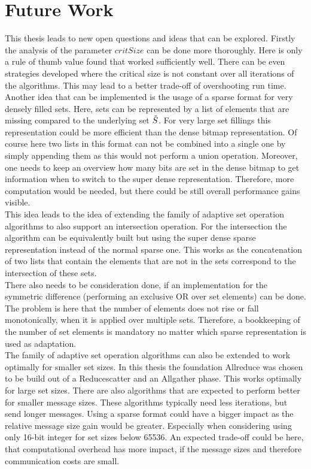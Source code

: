 \section{Future Work}
This thesis leads to new open questions and ideas that can be explored. Firstly the analysis of the parameter $critSize$ can be done more thoroughly. Here is only a rule of thumb value found that worked sufficiently well. There can be even strategies developed where the critical size is not constant over all iterations of the algorithms. This may lead to a better trade-off of overshooting run time.\\
Another idea that can be implemented is the usage of a sparse format for very densely filled sets. Here, sets can be represented by a list of elements that are missing compared to the underlying set $\Tilde{S}$. For very large set fillings this representation could be more efficient than the dense bitmap representation. Of course here two lists in this format can not be combined into a single one by simply appending them as this would not perform a union operation. Moreover, one needs to keep an overview how many bits are set in the dense bitmap to get information when to switch to the super dense representation. Therefore, more computation would be needed, but there could be still overall performance gains visible.\\
This idea leads to the idea of extending the family of adaptive set operation algorithms to also support an intersection operation. For the intersection the algorithm can be equivalently built but using the super dense sparse representation instead of the normal sparse one. This works as the concatenation of two lists that contain the elements that are not in the sets correspond to the intersection of these sets.\\
There also needs to be consideration done, if an implementation for the symmetric difference (performing an exclusive OR over set elements) can be done. The problem is here that the number of elements does not rise or fall monotonically, when it is applied over multiple sets. Therefore, a bookkeeping of the number of set elements is mandatory no matter which sparse representation is used as adaptation.\\
The family of adaptive set operation algorithms can also be extended to work optimally for smaller set sizes. In this thesis the foundation Allreduce was chosen to be build out of a Reducescatter and an Allgather phase. This works optimally for large set sizes. There are also algorithms that are expected to perform better for smaller message sizes. These algorithms typically need less iterations, but send longer messages. Using a sparse format could have a bigger impact as the relative message size gain would be greater. Especially when considering using only 16-bit integer for set sizes below 65536. An expected trade-off could be here, that computational overhead has more impact, if the message sizes  and therefore communication costs are small. \\
